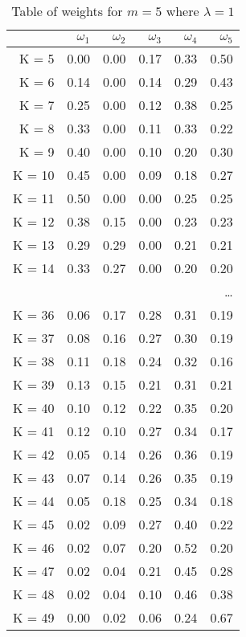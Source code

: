 \documentclass[a4paper,11pt]{article}
\begin{document}
\begin{table}[hh]
	\caption{Table of weights for $m=5$ where $\lambda = 1$}
	\centering
	\begin{tabular}{rrrrrr}
		\hline
		& $\omega_1$ &  $\omega_2$ &  $\omega_3$ &  $\omega_4$ &  $\omega_5$ \\
		\hline
		K = 5 & 0.00 & 0.00 & 0.17 & 0.33 & 0.50 \\ 
		K = 6 & 0.14 & 0.00 & 0.14 & 0.29 & 0.43 \\ 
		K = 7 & 0.25 & 0.00 & 0.12 & 0.38 & 0.25 \\ 
		K = 8 & 0.33 & 0.00 & 0.11 & 0.33 & 0.22 \\ 
		K = 9 & 0.40 & 0.00 & 0.10 & 0.20 & 0.30 \\ 
		K = 10& 0.45 & 0.00 & 0.09 & 0.18 & 0.27 \\ 
		K = 11& 0.50 & 0.00 & 0.00 & 0.25 & 0.25 \\ 
		K = 12 & 0.38 & 0.15 & 0.00 & 0.23 & 0.23 \\ 
		K = 13 & 0.29 & 0.29 & 0.00 & 0.21 & 0.21 \\ 
		K = 14 & 0.33 & 0.27 & 0.00 & 0.20 & 0.20 \\ 
		&&&&&\dots\\
		K = 36 & 0.06 & 0.17 & 0.28 & 0.31 & 0.19 \\ 
		K = 37 & 0.08 & 0.16 & 0.27 & 0.30 & 0.19 \\ 
		K = 38 & 0.11 & 0.18 & 0.24 & 0.32 & 0.16 \\ 
		K = 39 & 0.13 & 0.15 & 0.21 & 0.31 & 0.21 \\ 
		K = 40 & 0.10 & 0.12 & 0.22 & 0.35 & 0.20 \\ 
		K = 41 & 0.12 & 0.10 & 0.27 & 0.34 & 0.17 \\ 
		K = 42 & 0.05 & 0.14 & 0.26 & 0.36 & 0.19 \\ 
		K = 43 & 0.07 & 0.14 & 0.26 & 0.35 & 0.19 \\ 
		K = 44 & 0.05 & 0.18 & 0.25 & 0.34 & 0.18 \\ 
		K = 45 & 0.02 & 0.09 & 0.27 & 0.40 & 0.22 \\ 
		K = 46 & 0.02 & 0.07 & 0.20 & 0.52 & 0.20 \\ 
		K = 47 & 0.02 & 0.04 & 0.21 & 0.45 & 0.28 \\ 
		K = 48 & 0.02 & 0.04 & 0.10 & 0.46 & 0.38 \\ 
		K = 49 & 0.00 & 0.02 & 0.06 & 0.24 & 0.67 \\ 
		\hline
	\end{tabular}
\end{table}
\end{document}
